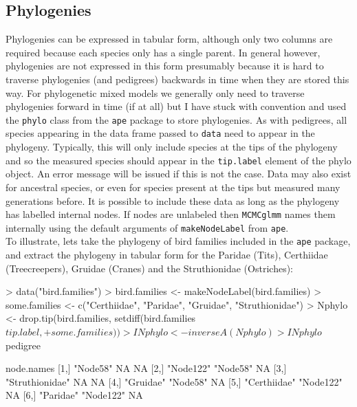 \documentclass{article}
\begin{document}
\subsection{Phylogenies}

Phylogenies can be expressed in tabular form, although only two columns are required because each species only has a single parent. In general however,  phylogenies are not expressed in this form presumably because it is hard to traverse phylogenies (and pedigrees) backwards in time when they are stored this way. For phylogenetic mixed models we generally only need to traverse phylogenies forward in time (if at all) but I have stuck with convention and used the \texttt{phylo} class from the \texttt{ape} package to store phylogenies.  As with pedigrees, all species appearing in the data frame passed to \texttt{data} need to appear in the phylogeny. Typically, this will only include species at the tips of the phylogeny and so the measured species should appear in the \texttt{tip.label} element of the phylo object. An error message will be issued if this is not the case. Data may also exist for ancestral species, or even for species present at the tips but measured many generations before. It is possible to include these data as long as the phylogeny has labelled internal nodes. If nodes are unlabeled then  \texttt{MCMCglmm}  names them internally using the default arguments of   \texttt{makeNodeLabel} from \texttt{ape}.\\ 

To illustrate, lets take the phylogeny of bird families included in the \texttt{ape} package, and extract the phylogeny in tabular form for the Paridae (Tits), Certhiidae (Treecreepers), Gruidae (Cranes) and the Struthionidae (Ostriches):

\begin{Schunk}
\begin{Sinput}
> data("bird.families")
> bird.families <- makeNodeLabel(bird.families)
> some.families <- c("Certhiidae", "Paridae", "Gruidae", "Struthionidae")
> Nphylo <- drop.tip(bird.families, setdiff(bird.families$tip.label, 
+     some.families))
> INphylo <- inverseA(Nphylo)
> INphylo$pedigree
\end{Sinput}
\begin{Soutput}
     node.names                  
[1,] "Node58"        NA        NA
[2,] "Node122"       "Node58"  NA
[3,] "Struthionidae" NA        NA
[4,] "Gruidae"       "Node58"  NA
[5,] "Certhiidae"    "Node122" NA
[6,] "Paridae"       "Node122" NA
\end{Soutput}
\end{Schunk}
\end{document}
